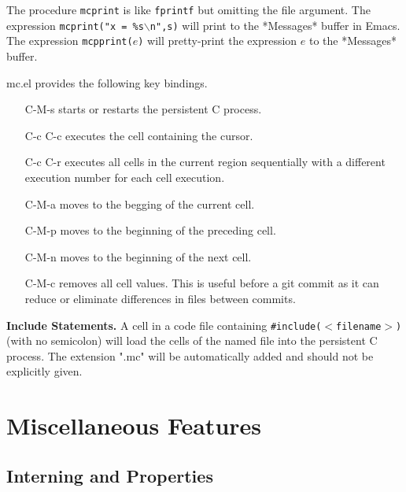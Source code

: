 \documentclass{article}
\begin{document}
 The procedure {\tt mcprint} is like {\tt fprintf} but omitting the file argument. The expression
{\tt mcprint("x = \%s$\backslash$n",s)} will print to the *Messages* buffer in Emacs. The expression {\tt mcpprint($e$)}
will pretty-print the expression $e$ to the *Messages* buffer.

  mc.el provides the following key bindings.

\begin{itemize}
\item[C-M-s] starts or restarts the persistent C process.

\item[C-c C-c] executes the cell containing the cursor.
  
\item[C-c C-r] executes all cells in the current region sequentially with a different execution number for each cell execution.

\item[C-M-a] moves to the begging of the current cell.

\item[C-M-p] moves to the beginning of the preceding cell.

\item[C-M-n] moves to the beginning of the next cell.

\item[C-M-c] removes all cell values.  This is useful before a git commit as it can reduce or eliminate differences
in files between commits.
\end{itemize}

{\bf Include Statements.}  A cell in a code file containing {\tt \#include($<$filename$>$)} (with no semicolon) will load the cells of the named
file into the persistent C process.  The extension ".mc" will be automatically added and should not be explicitly given.



\section{Miscellaneous Features}

\subsection{Interning and Properties}
\end{document}
